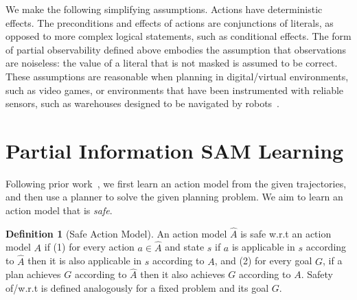 \documentclass{article}
\theoremstyle{plain}
\theoremstyle{definition}
\newtheorem{definition}[theorem]{Definition}
\theoremstyle{remark}
\theoremstyle{observation}
\begin{document}
We make the following simplifying assumptions. 
Actions have deterministic effects. 
The preconditions and effects of actions are conjunctions of literals, as opposed to more complex logical statements, such as conditional effects. 
The form of partial observability defined above embodies the assumption that observations are noiseless: the value of a literal that is not masked is assumed to be correct. 
These assumptions are reasonable when planning in digital/virtual environments, such as video games, or environments that have been instrumented with reliable sensors, such as warehouses designed to be navigated by robots~\citep{li2020lifelong}. 






\section{Partial Information SAM Learning}
Following prior work~\citep{stern2017efficientAndSafe,juba2021safe}, 
we first learn an action model from the given trajectories, and then use a planner to solve the given planning problem. 
We aim to learn an action model that is \emph{safe}. 
\begin{definition}[Safe Action Model]
An action model $\hat{A}$ is safe w.r.t an action model $A$ 
if (1) for every action $a\in\hat{A}$ and state $s$ if $a$ is applicable in $s$ according to $\hat{A}$ then it is also applicable in $s$ according to $A$, 
and (2) for every goal $G$, if a plan achieves $G$ according to $\hat{A}$ then it also achieves $G$ according to $A$. Safety of/w.r.t is defined analogously for a fixed problem and its goal $G$.
\label{def:safe-action-model}
\end{definition}

\end{document}
